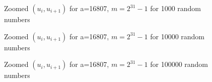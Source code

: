 \documentclass[11pt]{article}
\begin{document}
\begin{figure}[H]
	\centering
	\caption{Zoomed $(u_i,u_{i+1})$ for a=16807, $m=2^{31}-1$ for 1000 random numbers}
\end{figure}
\begin{figure}[H]
	\centering
	\caption{Zoomed $(u_i,u_{i+1})$ for a=16807, $m=2^{31}-1$ for 10000 random numbers}
\end{figure}
\begin{figure}[H]
	\centering
	\caption{Zoomed $(u_i,u_{i+1})$ for a=16807, $m=2^{31}-1$ for 100000 random numbers}
\end{figure}
\end{document}
